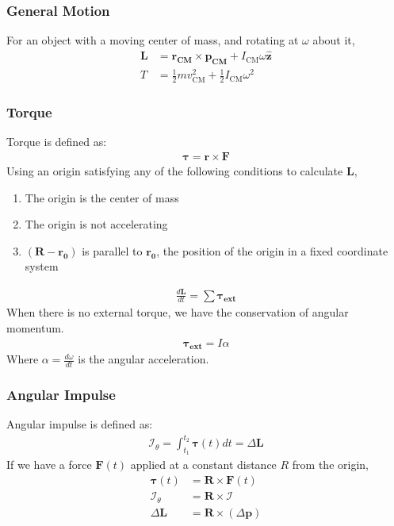 \documentclass[11pt, letterpaper]{article}
\newcommand{\Imp}{\mathcal{I}}	       %
\newcommand{\ve}[1]{
  \ensuremath{\bm{#1}}}	               %
\newcommand{\uve}[1]{
  \ensuremath{\bm{\hat{#1}}}}          %
\begin{document}
\begin{multicols*}{3}
\subsubsection{General Motion}
For an object with a moving center of mass, and rotating at $\omega$ about it, 
\begin{align*}
  \ve{L}&=\ve{r_\text{CM}}\times\ve{p_\text{CM}}+I_\text{CM}\omega \uve{z}\\
  T&=\frac{1}{2}mv_\text{CM}^2+\frac{1}{2}I_\text{CM}\omega^2
\end{align*}
\subsubsection{Torque}
Torque is defined as:
\begin{align*}
  \ve{\tau}=\ve{r}\times\ve{F}
\end{align*}
Using an origin satisfying any of the following conditions to calculate $\ve{L}$,
\begin{enumerate}
\item The origin is the center of mass
\item The origin is not accelerating
\item $(\ve{R}-\ve{r_0})$ is parallel to $\ve{r_0}$, the position of the origin in a fixed coordinate system
\end{enumerate}
\begin{align*}
  \frac{d\ve{L}}{dt}=\sum \ve{\tau_\text{ext}}
\end{align*}
When there is no external torque, we have the conservation of angular momentum. 
\begin{align*}
  \ve{\tau_\text{ext}}=I\alpha
\end{align*}
Where $\alpha=\frac{d\omega}{dt}$ is the angular acceleration. 
\subsubsection{Angular Impulse}
Angular impulse is defined as:
\begin{align*}
  \Imp_\theta=\int_{t_1}^{t_2}\ve{\tau}(t)dt=\Delta\ve{L}
\end{align*}
If we have a force $\ve{F}(t)$ applied at a constant distance $R$ from the origin,
\begin{align*}
  \ve{\tau}(t)&=\ve{R}\times\ve{F}(t) \\
  \Imp_\theta&=\ve{R}\times\Imp \\
  \Delta\ve{L}&=\ve{R}\times(\Delta\ve{p})
\end{align*}

\end{multicols*}
\end{document}
